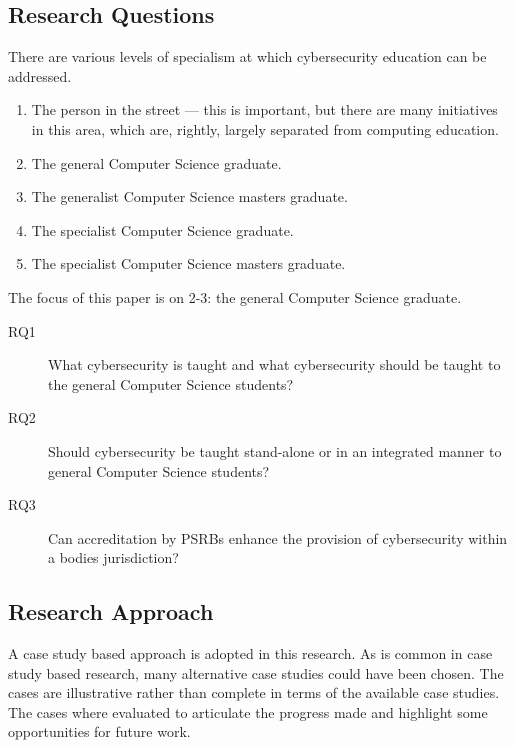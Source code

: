 \documentclass[conference]{IEEEtran}
\begin{document}
\subsection{Research Questions}
There are various levels of specialism at which cybersecurity education can be addressed.
\begin{enumerate}
\item The person in the street --- this is important, but there are many initiatives in this area, which are, rightly, largely separated from computing education.
\item The general Computer Science graduate.
\item The generalist Computer Science masters graduate.
\item The specialist Computer Science graduate.
\item The specialist Computer Science masters graduate.
\end{enumerate}
The focus of this paper is on 2-3: the general Computer Science graduate.
\begin{description}
\item[RQ1]What cybersecurity is taught and what cybersecurity should be taught to the general Computer Science  students?
\item[RQ2]Should cybersecurity be taught stand-alone or in an integrated manner to general Computer Science students?
\item[RQ3]Can accreditation by PSRBs enhance the provision of cybersecurity within a bodies jurisdiction?
\end{description}

\subsection{Research Approach}
A case study based approach is adopted in this research. As is common in case study based research, many alternative case studies could have been chosen. The cases are illustrative rather than complete in terms of the available case studies. The cases where evaluated to articulate the progress made and highlight some opportunities for future work. 
\end{document}
